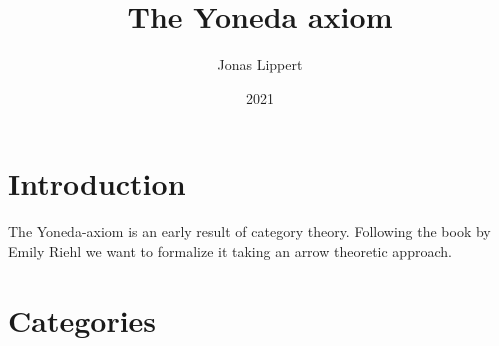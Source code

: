 \documentclass{article}
\title{The Yoneda axiom}
\author{Jonas Lippert}
\date{2021}
\begin{document}
	
	\maketitle
	
	
	
	\section{Introduction}
	
	The Yoneda-axiom is an early result of category theory. Following the book by Emily Riehl we want to formalize it taking an arrow theoretic approach.
	\newpage
	
	\section{Categories}
	\begin{comment}
	\begin{forthel}
	[synonym arrow/-s][synonym category/categories][synonym functor/-s]
	
	[checktime 10]
	[timelimit 10]
	[depthlimit 10]
	[checkdepth 10]
	\end{forthel}
	\end{comment}
	
\end{document}
